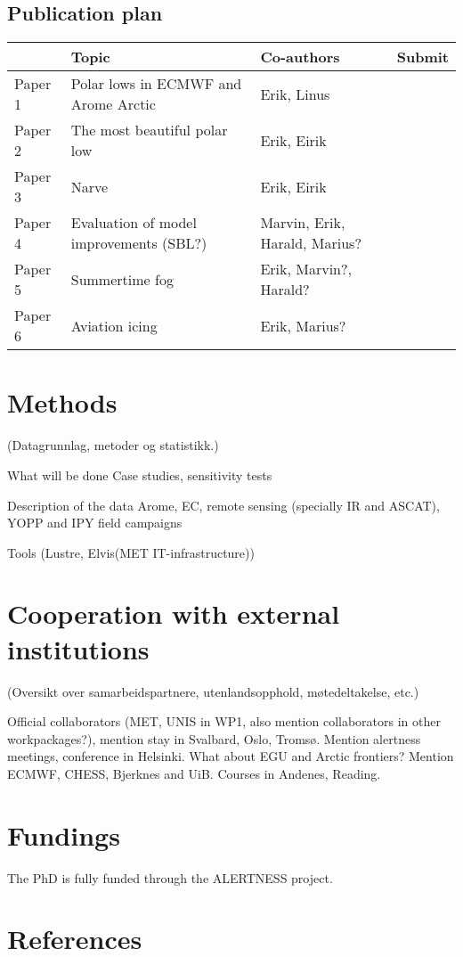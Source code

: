 \documentclass[a4paper,10pt]{article}
\begin{document}
\subsection{Publication plan}
 \begin{tabular}{ l  l  l  l } 

            & Topic & Co-authors & Submit \\ [0.5ex] 
 \hline
 \hline
 Paper 1 & Polar lows in ECMWF and Arome Arctic    & Erik, Linus                         & \\ [0.5ex]
 \hline
 Paper 2 & The most beautiful polar low                   & Erik, Eirik                          & \\[0.5ex]
 \hline
 Paper 3 &  Narve                                               & Erik, Eirik                          & \\[0.5ex]
 \hline
  Paper 4 & Evaluation of model improvements (SBL?) & Marvin, Erik, Harald, Marius? & \\[0.5ex]
 \hline
  Paper 5 &  Summertime fog                                 & Erik, Marvin?, Harald?          & \\[0.5ex]
 \hline
  Paper 6 & Aviation icing                                      & Erik, Marius?                     & \\[0.5ex]
 \hline
 \end{tabular}
\section{Methods}

(Datagrunnlag, metoder og statistikk.)

What will be done
Case studies, sensitivity tests

Description of the data
Arome, EC, remote sensing (specially IR and ASCAT), YOPP and IPY field campaigns

Tools (Lustre, Elvis(MET IT-infrastructure))

\section{Cooperation with external institutions}
 (Oversikt over samarbeidspartnere, utenlandsopphold, møtedeltakelse, etc.)

Official collaborators (MET, UNIS in WP1, also mention collaborators in other workpackages?), mention stay in Svalbard, Oslo, Tromsø. Mention alertness meetings, conference in Helsinki. What about EGU and Arctic frontiers? Mention ECMWF, CHESS, Bjerknes and UiB. Courses in Andenes, Reading.

\section{Fundings}

The PhD is fully funded through the ALERTNESS project.
\section{References}
\end{document}
